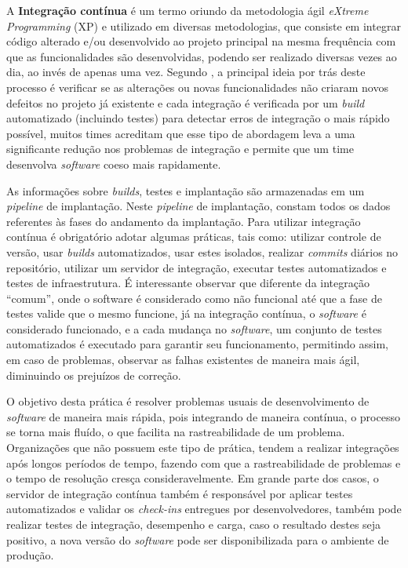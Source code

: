 \documentclass[twoside,english,brazilian]{UNISINOSartigo}
\begin{document}
A \textbf{Integração contínua} é um termo oriundo da metodologia ágil  \textit{eXtreme Programming} (XP) e utilizado em diversas metodologias, que consiste em integrar código alterado e/ou desenvolvido ao projeto principal na mesma frequência com que as funcionalidades são desenvolvidas, podendo ser realizado diversas vezes ao dia, ao invés de apenas uma vez. Segundo , a principal ideia  por trás deste processo é verificar se as alterações ou novas funcionalidades não criaram novos defeitos no projeto já existente e cada integração é verificada por um \textit{build} automatizado (incluindo testes) para detectar erros de integração o mais rápido possível, muitos times acreditam que esse tipo de abordagem leva a uma significante redução nos problemas de integração e permite que um time desenvolva \textit{software} coeso mais rapidamente.

As informações sobre \textit{builds}, testes e implantação são armazenadas em um \textit{pipeline} de implantação. Neste \textit{pipeline} de implantação, constam todos os dados referentes às fases do andamento da implantação. Para utilizar integração contínua é obrigatório adotar algumas práticas, tais como: utilizar controle de versão, usar \textit{builds} automatizados, usar estes isolados, realizar \textit{commits} diários no repositório, utilizar um servidor de integração, executar testes automatizados e testes de infraestrutura. É interessante observar que diferente da integração ``comum'', onde o software é considerado como não funcional até que a fase de testes valide que o mesmo funcione, já na integração contínua, o \textit{software} é considerado funcionado, e a cada mudança no \textit{software}, um conjunto de testes automatizados é executado para garantir seu funcionamento, permitindo assim, em caso de problemas, observar as falhas existentes de maneira mais ágil, diminuindo os prejuízos de correção.

O objetivo desta prática é resolver problemas usuais de desenvolvimento de \textit{software} de maneira mais rápida, pois integrando de maneira contínua, o processo se torna mais fluído, o que facilita na rastreabilidade de um problema. Organizações que não possuem este tipo de prática, tendem a realizar integrações após longos períodos de tempo, fazendo com que a rastreabilidade de problemas e o tempo de resolução cresça consideravelmente. Em grande parte dos casos, o servidor de integração contínua também é responsável por aplicar testes automatizados e validar os \textit{check-ins} entregues por desenvolvedores, também pode realizar testes de integração, desempenho e carga, caso o resultado destes seja positivo, a nova versão do \textit{software} pode ser disponibilizada para o ambiente de produção.
\end{document}
